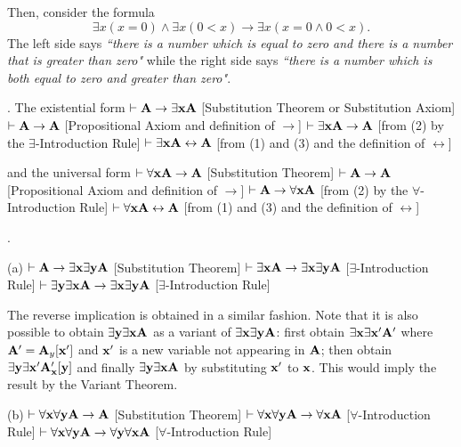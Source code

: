 Then, consider the formula
$$
\exists x (x=0) \land \exists x (0 < x) \to \exists x (x=0 \land 0 < x).
$$
The left side says {\it ``there is a number which is equal to zero and there is 
a number that is greater than zero"} while the right side says {\it ``there is a number
which is both equal to zero and greater than zero"}.


\medskip

. The existential form
 $\vdash {\bf A} \to \exists{\bf x}{\bf A}$ \hfill [Substitution Theorem or Substitution Axiom]
 $\vdash {\bf A} \to {\bf A}$ \hfill [Propositional Axiom and definition of $\to$]
 $\vdash \exists{\bf x}{\bf A} \to {\bf A}$ \hfill [from (2) by the $\exists$-Introduction Rule]
 $\vdash \exists{\bf x}{\bf A} \leftrightarrow {\bf A}$ \hfill [from (1) and (3) and the definition of $\leftrightarrow$]

\noindent and the universal form
 $\vdash \forall{\bf x}{\bf A} \to {\bf A}$ \hfill [Substitution Theorem]
 $\vdash {\bf A} \to {\bf A}$ \hfill [Propositional Axiom and definition of $\to$]
 $\vdash {\bf A} \to \forall{\bf x}{\bf A}$ \hfill [from (2) by the $\forall$-Introduction Rule]
 $\vdash \forall{\bf x}{\bf A} \leftrightarrow {\bf A}$ \hfill [from (1) and (3) and the definition of $\leftrightarrow$]

\medskip

. 

\ansitem (a) 
\itemitem{} $\vdash {\bf A} \to \exists{\bf x}\exists{\bf y}{\bf A}$ \hfill [Substitution Theorem]
\itemitem{} $\vdash \exists{\bf x}{\bf A} \to \exists{\bf x}\exists{\bf y}{\bf A}$ \hfill [$\exists$-Introduction Rule]
\itemitem{} $\vdash \exists{\bf y}\exists{\bf x}{\bf A} \to \exists{\bf x}\exists{\bf y}{\bf A}$ \hfill [$\exists$-Introduction Rule]

The reverse implication is obtained in a similar fashion. Note that it is also possible to obtain 
$\exists{\bf y}\exists{\bf x}{\bf A}$ as a variant of $\exists{\bf x}\exists{\bf y}{\bf A}$: first obtain $\exists{\bf x}\exists{\bf x}'{\bf A}'$
where ${\bf A}'={\bf A}_y[{\bf x}']$ and ${\bf x}'$ is a new variable not appearing in ${\bf A}$; then obtain $\exists{\bf y}\exists{\bf x}'{\bf A}'_{\bf x}[{\bf y}]$ 
and finally $\exists{\bf y}\exists{\bf x}{\bf A}$ by substituting ${\bf x}'$ to ${\bf x}$. This would imply the result by the
Variant Theorem.
\smallskip

\ansitem (b)
\itemitem{} $\vdash \forall{\bf x}\forall{\bf y}{\bf A} \to {\bf A}$ \hfill [Substitution Theorem]
\itemitem{} $\vdash \forall{\bf x}\forall{\bf y}{\bf A} \to \forall{\bf x}{\bf A}$ \hfill [$\forall$-Introduction Rule]
\itemitem{} $\vdash \forall{\bf x}\forall{\bf y}{\bf A} \to \forall{\bf y}\forall{\bf x}{\bf A}$ \hfill [$\forall$-Introduction Rule]

